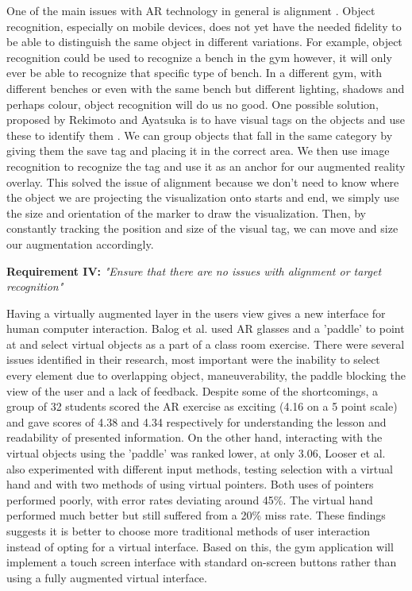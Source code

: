\documentclass{l4proj}
\begin{document}
One of the main issues with AR technology in general is alignment \cite{sood_pro_2012}. Object recognition, especially on mobile devices, does not yet have the needed fidelity to be able to distinguish the same object in different variations. For example, object recognition could be used to recognize a bench in the gym however, it will only ever be able to recognize that specific type of bench. In a different gym, with different benches or even with the same bench but different lighting, shadows and perhaps colour, object recognition will do us no good. One possible solution, proposed by Rekimoto and Ayatsuka is to have visual tags on the objects and use these to identify them \cite{rekimoto_cybercode:_2000}. We can group objects that fall in the same category by giving them the save tag and placing it in the correct area. We then use image recognition to recognize the tag and use it as an anchor for our augmented reality overlay. This solved the issue of alignment because we don't need to know where the object we are projecting the visualization onto starts and end, we simply use the size and orientation of the marker to draw the visualization. Then, by constantly tracking the position and size of the visual tag, we can move and size our augmentation accordingly.

\textbf{Requirement IV:} \textit{"Ensure that there are no issues with alignment or target recognition"}  \label{requirement_IV}

Having a virtually augmented layer in the users view gives a new interface for human computer interaction. Balog et al. used AR glasses and a 'paddle' to point at and select virtual objects as a part of a class room exercise. There were several issues identified in their research, most important were the inability to select every element due to overlapping object, maneuverability, the paddle blocking the view of the user and a lack of feedback\cite{balog_augmented_2007}. Despite some of the shortcomings, a group of 32 students scored the AR exercise as exciting (4.16 on a 5 point scale) and gave scores of 4.38 and 4.34 respectively for understanding the lesson and readability of presented information\cite{looser_evaluation_2007}. On the other hand, interacting with the virtual objects using the 'paddle' was ranked lower, at only 3.06\cite{balog_augmented_2007}, Looser et al. also experimented with different input methods, testing selection with a virtual hand and with two methods of using virtual pointers\cite{looser_evaluation_2007}. Both uses of pointers performed poorly, with error rates deviating around 45\%\cite{looser_evaluation_2007}. The virtual hand performed much better but still suffered from a 20\% miss rate\cite{looser_evaluation_2007}. These findings suggests it is better to choose  more traditional methods of user interaction instead of opting for a virtual interface. Based on this, the gym application will implement a touch screen interface with standard on-screen buttons rather than using a fully augmented virtual interface. 
\end{document}
